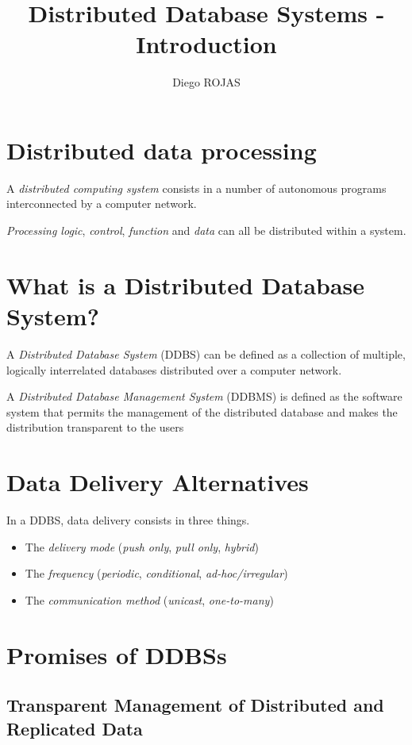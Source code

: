 \documentclass[12pt]{article}
\title{Distributed Database Systems - Introduction}
\author{Diego ROJAS}
\begin{document}
\maketitle
\tableofcontents

\section{Distributed data processing}

A \textit{distributed computing system} consists in a number of autonomous programs interconnected by a computer network.

\textit{Processing logic}, \textit{control}, \textit{function} and \textit{data} can all be distributed within a system.

\section{What is a Distributed Database System?}

A \textit{Distributed Database System} (DDBS) can be defined as a collection of multiple, logically interrelated databases distributed over a computer network.

A \textit{Distributed Database Management System} (DDBMS) is defined as the software system that permits the management of the distributed database and makes the distribution transparent to the users

\section{Data Delivery Alternatives}

In a DDBS, data delivery consists in three things.

\begin{itemize}
	\item The \textit{delivery mode} (\textit{push only}, \textit{pull only}, \textit{hybrid})
	\item The \textit{frequency} (\textit{periodic}, \textit{conditional}, \textit{ad-hoc/irregular})
	\item The \textit{communication method} (\textit{unicast}, \textit{one-to-many})
\end{itemize}

\section{Promises of DDBSs}

\subsection{Transparent Management of Distributed and Replicated Data}
\end{document}
